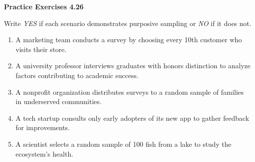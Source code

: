 \vspace{0.3ex}
\noindent\textbf{Practice Exercises 4.26}

\vspace{0.2ex}

Write \emph{YES} if each scenario demonstrates purposive sampling or \emph{NO} if it does not.

\begin{enumerate}
    \item A marketing team conducts a survey by choosing every 10th customer who visits their store.
    \item A university professor interviews graduates with honors distinction to analyze factors contributing to academic success.
    \item A nonprofit organization distributes surveys to a random sample of families in underserved communities.
    \item A tech startup consults only early adopters of its new app to gather feedback for improvements.
    \item A scientist selects a random sample of 100 fish from a lake to study the ecosystem's health.
    \end{enumerate}
    
